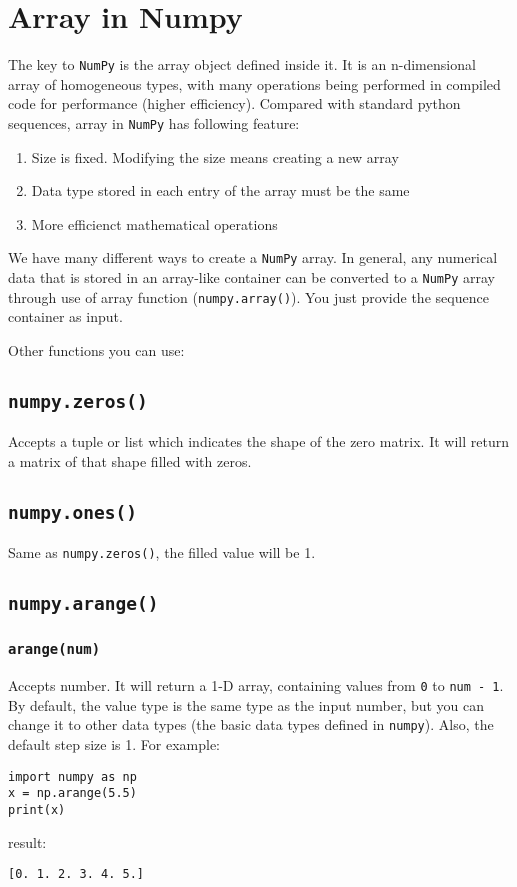 \documentclass[12pt]{book}
\begin{document}
\section{Array in Numpy}
\label{sec:orgd292ce2}
The key to \texttt{NumPy} is the array object defined inside it. It is an n-dimensional array of homogeneous types, with many operations being performed in compiled code for performance (higher efficiency). Compared with standard python sequences, array in \texttt{NumPy} has following feature:
\begin{enumerate}
\item Size is fixed. Modifying the size means creating a new array
\item Data type stored in each entry of the array must be the same
\item More efficienct mathematical operations
\end{enumerate}

We have many different ways to create a \texttt{NumPy} array. In general, any numerical data that is stored in an array-like container can be converted to a \texttt{NumPy} array through use of array function (\texttt{numpy.array()}). You just provide the sequence container as input.

Other functions you can use:
\subsection{\texttt{numpy.zeros()}}
\label{sec:orgdc0a3f1}
Accepts a tuple or list which indicates the shape of the zero matrix. It will return a matrix of that shape filled with zeros.
\subsection{\texttt{numpy.ones()}}
\label{sec:org4f7f3b8}
Same as \texttt{numpy.zeros()}, the filled value will be 1.
\subsection{\texttt{numpy.arange()}}
\label{sec:orgbcc4894}
\subsubsection{\texttt{arange(num)}}
\label{sec:org92527a9}
Accepts number. It will return a 1-D array, containing values from \texttt{0} to \texttt{num - 1}. By default, the value type is the same type as the input number, but you can change it to other data types (the basic data types defined in \texttt{numpy}). Also, the default step size is 1. For example:
\begin{verbatim}
import numpy as np
x = np.arange(5.5)
print(x)
\end{verbatim}
result:
\begin{verbatim}
[0. 1. 2. 3. 4. 5.]
\end{verbatim}
\end{document}
